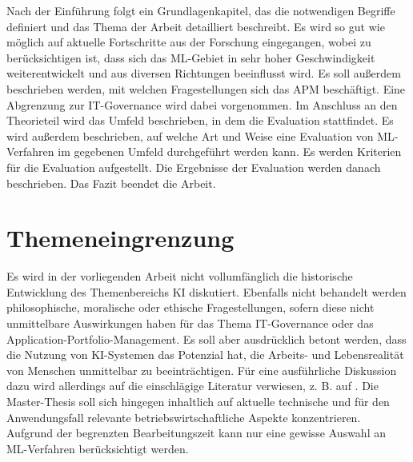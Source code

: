Nach der Einführung folgt ein Grundlagenkapitel, das die notwendigen Begriffe definiert und das Thema der Arbeit detailliert beschreibt. Es wird so gut wie möglich auf aktuelle Fortschritte aus der Forschung eingegangen, wobei zu berücksichtigen ist, dass sich das ML-Gebiet in sehr hoher Geschwindigkeit weiterentwickelt \cite[S. 146]{Gupta} und aus diversen Richtungen beeinflusst wird. Es soll außerdem beschrieben werden, mit welchen Fragestellungen sich das APM beschäftigt. Eine Abgrenzung zur IT-Governance wird dabei vorgenommen. Im Anschluss an den Theorieteil wird das Umfeld beschrieben, in dem die Evaluation stattfindet. Es wird außerdem beschrieben, auf welche Art und Weise eine Evaluation von ML-Verfahren im gegebenen Umfeld durchgeführt werden kann. Es werden Kriterien für die Evaluation aufgestellt. Die Ergebnisse der Evaluation werden danach beschrieben. Das Fazit beendet die Arbeit.

\section{Themeneingrenzung}

Es wird in der vorliegenden Arbeit nicht vollumfänglich die historische Entwicklung des Themenbereichs KI diskutiert. Ebenfalls nicht behandelt werden philosophische, moralische oder ethische Fragestellungen, sofern diese nicht unmittelbare Auswirkungen haben für das Thema IT-Governance oder das Application-Portfolio-Management. Es soll aber ausdrücklich betont werden, dass die Nutzung von KI-Systemen das Potenzial hat, die Arbeits- und Lebensrealität von Menschen unmittelbar zu beeinträchtigen. Für eine ausführliche Diskussion dazu wird allerdings auf die einschlägige Literatur verwiesen, z. B. auf \cite[S. 11-16]{Ertel}. Die Master-Thesis soll sich hingegen inhaltlich auf aktuelle technische und für den Anwendungsfall relevante betriebswirtschaftliche Aspekte konzentrieren. 
Aufgrund der begrenzten Bearbeitungszeit kann nur eine gewisse Auswahl an ML-Verfahren berücksichtigt werden.

